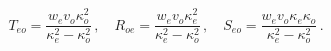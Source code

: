 \begin{equation}
T_{eo}={\frac{w_{e}v_{o}\kappa _{o}^{2}}{\kappa _{e}^{2}-\kappa _{o}^{2}}}%
\,,\quad R_{oe}={\frac{w_{e}v_{o}\kappa _{e}^{2}}{\kappa _{e}^{2}-\kappa
_{o}^{2}}}\,,\quad S_{eo}={\frac{w_{e}v_{o}\kappa _{e}\kappa _{o}}{\kappa
_{e}^{2}-\kappa _{o}^{2}}}\,.  \label{eqs:defns}
\end{equation}

